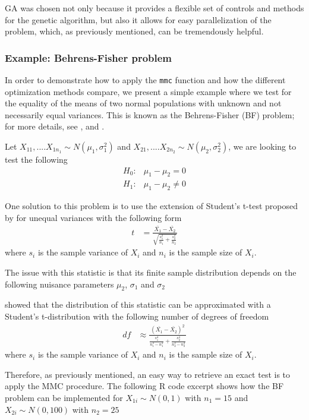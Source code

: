 \documentclass[]{article}\usepackage[]{graphicx}\usepackage[]{color}
\newcommand{\pkg}[1]{{\normalfont\fontseries{b}\selectfont #1}}
\let\proglang=\textsf
\let\code=\texttt
\begin{document}
	\pkg{GA} was chosen not only because it provides a flexible set of controls and methods for the genetic algorithm, but also it allows for easy parallelization of the problem, which, as previously mentioned, can be tremendously helpful.

	\subsubsection{Example: Behrens-Fisher problem}

	In order to demonstrate how to apply the \code{mmc} function and how the different optimization methods compare, we present a simple example where we test for the equality of the means of two normal populations with unknown and not necessarily equal variances. This is known as the Behrens-Fisher (BF) problem; for more details, see \cite{fisher_fiducial_1935}, \cite{fisher_asymptotic_1941} and  \cite{behrens_beitrag_1929}.

	Let $X_{11},....X_{1n_1} \sim N(\mu_1,\sigma_1^2)$ and $X_{21},....X_{2n_2} \sim N(\mu_2,\sigma_2^2)$, we are looking to test the following
	\begin{align}
		H_0 :  &  \mu_1-\mu_2=0\\
		H_1 :  &  \mu_1-\mu_2 \neq 0
	\end{align}

	One solution to this problem is to use the extension of Student's t-test proposed by \cite{welch_generalization_1947} for unequal variances with the following form
	\begin{align}
		t & = \frac{\bar{X_1}-\bar{X_2}}{\sqrt{\frac{s_1^2}{n_1}+\frac{s_2^2}{n_2}}}
	\end{align}
	where $s_i$ is the sample variance of $X_i$ and $n_i$ is the sample size of $X_i$.

	The issue with this statistic is that its finite sample distribution depends on the following nuisance parameters $\mu_2$, $\sigma_1$ and $\sigma_2$

	\cite{welch_significance_1938} showed that the distribution of this statistic can be approximated with a Student's t-distribution with the following number of degrees of freedom
	\begin{align}
		df & \approx \frac{{\left( \bar{X_1}-\bar{X_2} \right)} ^2}{\frac{s_1^4}{n_1^3-n_1^2}+\frac{s_2^4}{n_2^3-n_2^2}}
	\end{align}
	where $s_i$ is the sample variance of $X_i$ and $n_i$ is the sample size of $X_i$.

	Therefore, as previously mentioned, an easy way to retrieve an exact test is to apply the MMC procedure. The following \proglang{R} code excerpt shows how the BF problem can be implemented for $X_{1i} \sim N(0,1)$ with $n_1=15$ and $X_{2i} \sim N(0,100)$ with $n_2=25$
\end{document}
